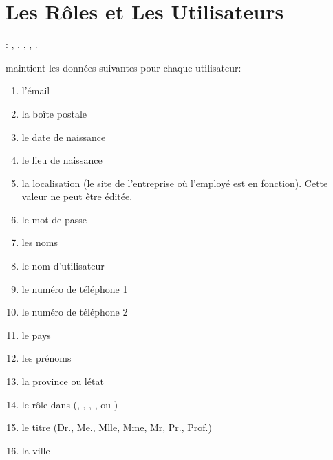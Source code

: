 \chapter{Les R\^oles et Les Utilisateurs}\label{chap:utilisateurs}

\utilisateurs: \lienadmin, \liencaissier, \lienmagasinier, \lienmanager, \lienvendeur.\\


\label{sec:utilisateurs-introduction}

\yeren maintient les donn\'ees suivantes pour chaque utilisateur:
\begin{enumerate}[1)]
	\item l'\'email 
	\item la bo\^ite postale
	\item le date de naissance 
	\item le lieu de naissance 
	\item la localisation (le site de l'entreprise o\`u l'employ\'e
	      est en fonction). Cette valeur ne peut \^etre \'edit\'ee.
	\item le mot de passe \obligatoire
	\item les noms \obligatoire
	\item le nom d'utilisateur \obligatoire
	\item le num\'ero de t\'el\'ephone 1 
	\item le num\'ero de t\'el\'ephone 2 
	\item le pays 
	\item les pr\'enoms \obligatoire
	\item la province ou l\'etat
	\item le r\^ole dans \yeren (\admin, \caissier, \magasinier, \manager, ou \vendeur) \obligatoire
	\item le titre (Dr., Me., Mlle, Mme, Mr, Pr., Prof.) \obligatoire
	\item la ville 
\end{enumerate}

\newpage



\newpage



\newpage



\newpage



\newpage


	
\newpage


